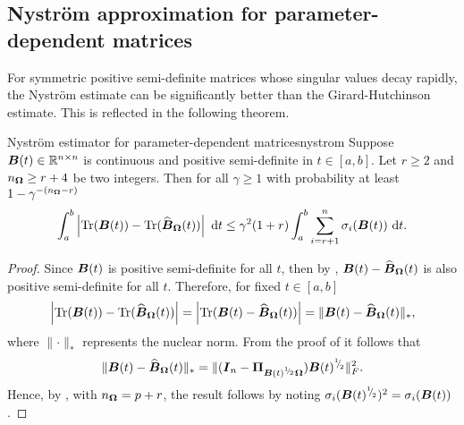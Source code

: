 \documentclass[12pt]{article}
\begin{document}
\subsection{Nyström approximation for parameter-dependent matrices}
\label{subsec:nystrom}

For symmetric positive semi-definite matrices whose singular values decay rapidly, the Nyström estimate  can be significantly better than the Girard-Hutchinson estimate. This is reflected in the following theorem.

\begin{theorem}{Nyström estimator for parameter-dependent matrices}{nystrom}
    Suppose $\boldsymbol{B}(t) \in \mathbb{R}^{n \times n}$ is continuous and positive semi-definite in $t \in [a, b]$. Let $r \geq 2$ and $n_{\boldsymbol{\Omega}} \geq r + 4$ be two integers. Then for all $\gamma \geq 1$ with probability at least $1 - \gamma^{-(n_{\boldsymbol{\Omega}} - r)}$
    \begin{equation}
        \int_{a}^{b} \left| \operatorname{Tr}(\boldsymbol{B}(t)) - \operatorname{Tr}(\widehat{\boldsymbol{B}}_{\boldsymbol{\Omega}}(t)) \right| ~\mathrm{d}t
        \leq \gamma^2 (1 + r) \int_{a}^{b} \sum_{i = r+1}^{n} \sigma_i(\boldsymbol{B}(t)) ~\mathrm{d}t.
    \end{equation}
\end{theorem}

\begin{proof}
    Since $\boldsymbol{B}(t)$ is positive semi-definite for all $t$, then by \cite[lemma 2.1]{frangella-2023-randomized-nystrom}, $\boldsymbol{B}(t) - \widehat{\boldsymbol{B}}_{\boldsymbol{\Omega}}(t)$ is also positive semi-definite for all $t$. Therefore, for fixed $t \in [a, b]$
    \begin{equation}
        \left| \operatorname{Tr}(\boldsymbol{B}(t)) - \operatorname{Tr}(\widehat{\boldsymbol{B}}_{\boldsymbol{\Omega}}(t)) \right|
        = \left| \operatorname{Tr}(\boldsymbol{B}(t) - \widehat{\boldsymbol{B}}_{\boldsymbol{\Omega}}(t)) \right|
        = \lVert \boldsymbol{B}(t) - \widehat{\boldsymbol{B}}_{\boldsymbol{\Omega}}(t) \rVert _{\ast},
    \end{equation}
    where $\lVert \cdot \rVert _{\ast}$ represents the nuclear norm.  From the proof of \cite[corollary 8.2]{tropp-2023-randomized-algorithms} it follows that
    \begin{equation}
        \lVert \boldsymbol{B}(t) - \widehat{\boldsymbol{B}}_{\boldsymbol{\Omega}}(t) \rVert _{\ast} = \lVert (\boldsymbol{I}_n - \boldsymbol{\Pi}_{\boldsymbol{B}(t)^{{}^{1}{\mskip -5mu/\mskip -3mu}_{2}} \boldsymbol{\Omega}}) \boldsymbol{B}(t)^{{}^{1}{\mskip -5mu/\mskip -3mu}_{2}} \rVert _F^2.
    \end{equation}
    Hence, by \cite[theorem 9]{kressner-2023-randomized-lowrank}, with $n_{\boldsymbol{\Omega}} = p + r$, the result follows by noting $\sigma_i(\boldsymbol{B}(t)^{{}^{1}{\mskip -5mu/\mskip -3mu}_{2}})^{2} = \sigma_i(\boldsymbol{B}(t))$.

\end{proof}
\end{document}
